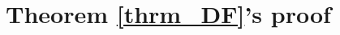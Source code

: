 \documentclass[journal]{IEEEtran}
\begin{document}
\section{Theorem \ref{thrm_DF}'s proof}
\label{apdx_thrm_DF}

\ifCLASSOPTIONcaptionsoff
  \newpage
\fi

\end{document}
